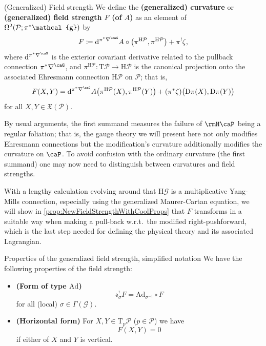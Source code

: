 \documentclass[reqno,a4paper,oneside]{amsart}
\theoremstyle{plain}
\theoremstyle{remark}
\theoremstyle{definition}
\begin{document}
\begin{definitions*}{(Generalized) Field strength}
We define the \textbf{(generalized) curvature} or \textbf{(generalized) field strength $F$ (of $A$)} as an element of $\Omega^2\mleft( \mathcal{P}; \pi^*\mathcal{g} \mright)$ by
\begin{equation*}
F
\coloneqq
\mathrm{d}^{\pi^*\nabla^\caG} A \circ \mleft( \pi^{\mathrm{H}\mathcal{P}}, \pi^{\mathrm{H}\mathcal{P}} \mright)
	+ \pi^!\zeta,
\end{equation*}
where $\mathrm{d}^{\pi^*\nabla^\caG}$ is the exterior covariant derivative related to the pullback connection $\pi^*\nabla^\caG$, and $\pi^{\mathrm{H}\mathcal{P}}\colon \mathrm{T}\mathcal{P} \to \mathrm{H}\mathcal{P}$ is the canonical projection onto the associated Ehresmann connection $\mathrm{H}\mathcal{P}$ on $\mathcal{P}$; that is,
\begin{equation*}
F(X, Y)
=
\mathrm{d}^{\pi^*\nabla^\caG} A \mleft( \pi^{\mathrm{H}\mathcal{P}}(X), \pi^{\mathrm{H}\mathcal{P}}(Y) \mright)
	+ \mleft(\pi^*\zeta\mright) \bigl( \mathrm{D}\pi(X), \mathrm{D}\pi(Y) \bigr)
\end{equation*}
for all $X, Y \in \mathfrak{X}(\mathcal{P})$.
\end{definitions*}

By usual arguments, the first summand measures the failure of $\rmH\caP$ being a regular foliation; that is, the gauge theory we will present here not only modifies Ehresmann connections but the modification's curvature additionally modifies the curvature on $\caP$. To avoid confusion with the ordinary curvature (the first summand) one may now need to distinguish between curvatures and field strengths.

With a lengthy calculation evolving around that $\mathrm{H}\mathcal{G}$ is a multiplicative Yang-Mills connection, especially using the generalized Maurer-Cartan equation, we will show in \ref{prop:NewFieldStrengthWithCoolProps} that $F$ transforms in a suitable way when making a pull-back w.r.t.\ the modified right-pushforward, which is the last step needed for defining the physical theory and its associated Lagrangian.

\begin{propositions*}{Properties of the generalized field strength, simplified notation}
We have the following properties of the field strength:
\begin{itemize}
	\item \textbf{(Form of type $\mathrm{Ad}$)}
	\begin{equation*}
	\mathcal{r}_{\sigma}^!F
	=
	\mathrm{Ad}_{\sigma^{-1}} \circ F
	\end{equation*}
	for all (local) $\sigma \in \Gamma(\mathcal{G})$.
	\item \textbf{(Horizontal form)}
	\newline
	For $X, Y \in \mathrm{T}_p\mathcal{P}$ ($p \in \mathcal{P}$) we have
	\begin{equation*}
	F(X, Y)
	=
	0
	\end{equation*}
	if either of $X$ and $Y$ is vertical.
\end{itemize}
\end{propositions*}
\end{document}
